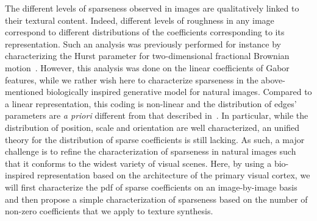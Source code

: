\documentclass{article}
\begin{document}
The different levels of sparseness observed in images are qualitatively linked to their textural content. Indeed, different levels of roughness in any image correspond to different distributions of the coefficients corresponding to its representation. Such an analysis was previously performed for instance by characterizing the Hurst parameter for two-dimensional fractional Brownian motion~\citep{Kaplan1999}. However, this analysis was done on the linear coefficients of Gabor features, while we rather wish here to characterize sparseness in the above-mentioned biologically inspired generative model for natural images. Compared to a linear representation, this coding is non-linear and the distribution of edges' parameters are \emph{a priori} different from that described in~\citep{Kaplan1999}. In particular, while the distribution of position, scale and orientation are well characterized, an unified theory for the distribution of sparse coefficients is still lacking. As such, a major challenge is to refine the characterization of sparseness in natural images such that it conforms to the widest variety of visual scenes. Here, by using a bio-inspired representation based on the architecture of the primary visual cortex, we will first characterize the pdf of sparse coefficients on an image-by-image basis and then propose a simple characterization of sparseness based on the number of non-zero coefficients that we apply to texture synthesis.
\end{document}
